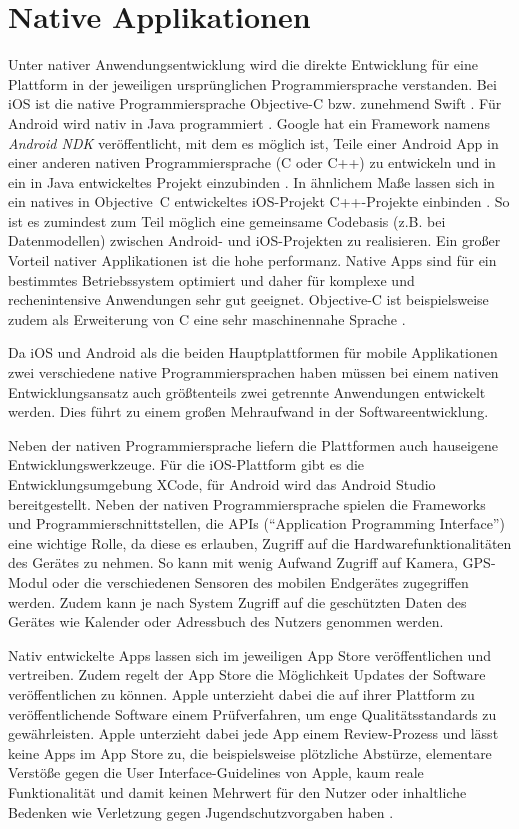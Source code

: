 \section{Native Applikationen}
\label{sec:nativeApplikationen}
%
Unter nativer Anwendungsentwicklung wird die direkte Entwicklung für eine Plattform in der jeweiligen ursprünglichen Programmiersprache verstanden. Bei iOS ist die native Programmiersprache Objective-C bzw. zunehmend Swift \cite{appleDokuSwift}. Für Android wird nativ in Java programmiert \cite{googleAndroidDoku}. Google hat ein Framework namens \emph{Android NDK} veröffentlicht, mit dem es möglich ist, Teile einer Android App in einer anderen nativen Programmiersprache (C oder C++) zu entwickeln und in ein in Java entwickeltes Projekt einzubinden \cite{googleAndroidNDKDoku}. In ähnlichem Maße lassen sich in ein natives in Objective~C entwickeltes iOS-Projekt C++-Projekte einbinden \cite{appleDokuCppObjectiveC}. So ist es zumindest zum Teil möglich eine gemeinsame Codebasis (z.B. bei Datenmodellen) zwischen Android- und iOS-Projekten zu realisieren.
Ein großer Vorteil nativer Applikationen ist die hohe performanz. Native Apps sind für ein bestimmtes Betriebssystem optimiert und daher für komplexe und rechenintensive Anwendungen sehr gut geeignet. Objective-C ist beispielsweise zudem als Erweiterung von C eine sehr maschinennahe Sprache \cite{appleObjectiveC}. 

Da iOS und Android als die beiden Hauptplattformen für mobile Applikationen zwei verschiedene native Programmiersprachen haben müssen bei einem nativen Entwicklungsansatz auch größtenteils zwei getrennte Anwendungen entwickelt werden. Dies führt zu einem großen Mehraufwand in der Softwareentwicklung.

Neben der nativen Programmiersprache liefern die Plattformen auch hauseigene Entwicklungswerkzeuge. Für die iOS-Plattform gibt es die Entwicklungsumgebung XCode, für Android wird das Android Studio bereitgestellt. Neben der nativen Programmiersprache spielen die Frameworks und Programmierschnittstellen, die APIs (\enquote{Application Programming Interface}) eine wichtige Rolle, da diese es erlauben, Zugriff auf die Hardwarefunktionalitäten des Gerätes zu nehmen. So kann mit wenig Aufwand Zugriff auf Kamera, GPS-Modul oder die verschiedenen Sensoren des mobilen Endgerätes zugegriffen werden. Zudem kann je nach System Zugriff auf die geschützten Daten des Gerätes wie Kalender oder Adressbuch des Nutzers genommen werden. 

Nativ entwickelte Apps lassen sich im jeweiligen App Store veröffentlichen und vertreiben. Zudem regelt der App Store die Möglichkeit Updates der Software veröffentlichen zu können. Apple unterzieht dabei die auf ihrer Plattform zu veröffentlichende Software einem Prüfverfahren, um enge Qualitätsstandards zu gewährleisten. Apple unterzieht dabei jede App einem Review-Prozess und lässt keine Apps im App Store zu, die beispielsweise plötzliche Abstürze, elementare Verstöße gegen die User Interface-Guidelines von Apple, kaum reale Funktionalität und damit keinen Mehrwert für den Nutzer oder inhaltliche Bedenken wie Verletzung gegen Jugendschutzvorgaben haben \cite{appleReview}.
%
